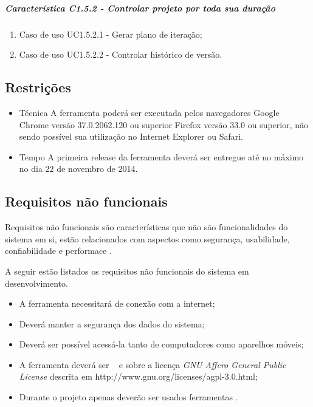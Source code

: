 	\subparagraph{Característica C1.5.2 - Controlar projeto por toda sua duração}
		\begin{enumerate}
			\item Caso de uso UC1.5.2.1 - Gerar plano de iteração;
			\item Caso de uso UC1.5.2.2 - Controlar histórico de versão.
		\end{enumerate}

\subsection{Restrições}

\begin{itemize}
	\item Técnica
		A ferramenta poderá ser executada pelos navegadores Google Chrome versão 37.0.2062.120 ou superior Firefox versão 33.0 ou superior, não sendo possível sua utilização no Internet Explorer ou Safari.
	\item Tempo
		A primeira release da ferramenta deverá ser entregue até no máximo no dia 22 de novembro de 2014.
\end{itemize}

\subsection{Requisitos não funcionais}

Requisitos não funcionais são características que não são funcionalidades do sistema em si, estão relacionados com aspectos como segurança, usabilidade, confiabilidade e performace \cite{derequisitos}.

A seguir estão listados os requisitos não funcionais do sistema em desenvolvimento.

\begin{itemize}
	\item A ferramenta necessitará de conexão com a internet;
	\item Deverá manter a segurança dos dados do sistema;
	\item Deverá ser possível acessá-la tanto de computadores como aparelhos móveis;
	\item A ferramenta deverá ser \opensource~ e sobre a licença \textit{GNU Affero General Public License} descrita em http://www.gnu.org/licenses/agpl-3.0.html;
	\item Durante o projeto apenas deverão ser usados ferramentas \opensource.
\end{itemize}


